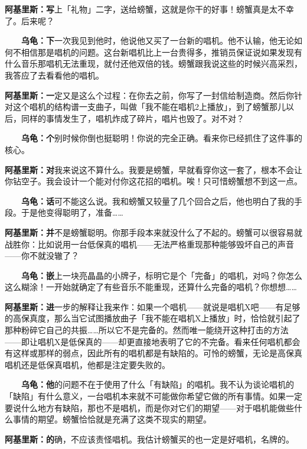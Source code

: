 \documentclass[
  12pt,
  twoside,
  openright,
  oldfontcommands,
]{memoir}
\newcommand{\heititext}[1]{{\heifamily\bfseries #1}}
\newcommand{\dialogname}[1]{{\heifamily\bfseries #1}}
\begin{document}
\dialogname{阿基里斯：}\heititext{写}上「礼物」二字，送给螃蟹，这就是你干的好事！螃蟹真是太不幸了。后来呢？

\dialogname{　　乌龟：}\heititext{下}一次我见到他时，他说他又买了一台新的唱机。他不认输，他无论如何不相信那是唱机的问题。这台新唱机比上一台贵得多，推销员保证说如果发现有什么音乐那唱机无法重现，就付还他双倍的钱。螃蟹跟我说这些的时候兴高采烈，我答应了去看看他的唱机。

\dialogname{阿基里斯：}\heititext{一}定又是这么个过程：在你去之前，你写了一封信给制造商。然后你针对这个唱机的结构谱一支曲子，叫做「我不能在唱机2上播放」，到了螃蟹那儿以后，同样的事情发生了，唱机炸成了碎片，唱片也毁了。对不对？

\dialogname{　　乌龟：}\heititext{个}别时候你倒也挺聪明！你说的完全正确。看来你已经抓住了这件事的核心。

\dialogname{阿基里斯：}\heititext{对}我来说这不算什么。我要是螃蟹，早就看穿你这一套了，根本不会让你钻空子。我会设计一个能对付你这花招的唱机。唉！只可惜螃蟹想不到这一点。

\dialogname{　　乌龟：}\heititext{话}可不能这么说。我和螃蟹又较量了几个回合之后，他也明白了我的手段。于是他变得聪明了，准备\ldots\ldots{}

\dialogname{阿基里斯：}\heititext{并}不是螃蟹聪明。你那手段本来就没什么了不起的。螃蟹可以很容易就战胜你：比如说用一台低保真的唱机------无法严格重现那种能够毁坏自己的声音------你不就没辙了？

\dialogname{　　乌龟：}\heititext{嵌}上一块亮晶晶的小牌子，标明它是个「完备」的唱机，对吗？你怎么这么糊涂！一开始就确定了有些音乐不能重现，还算什么完备的唱机？你想想\ldots\ldots{}

\dialogname{阿基里斯：}\heititext{进}一步的解释让我来作：如果一个唱机------就说是唱机X吧------有足够的高保真度，那么当它试图播放曲子「我不能在唱机X上播放」时，恰恰就引起了那种粉碎它自己的共振\ldots\ldots 所以它不是完备的。然而唯一能绕开这种打击的方法------即让唱机X是低保真的------却更直接地表明了它的不完备。看来任何唱机都会有这样或那样的弱点，因此所有的唱机都是有缺陷的。可怜的螃蟹，无论是高保真唱机还是低保真唱机，他都是注定要失败的。

\dialogname{　　乌龟：}\heititext{他}的问题不在于使用了什么「有缺陷」的唱机。我不认为谈论唱机的「缺陷」有什么意义，一台唱机本来就不可能做你希望它做的所有事情。如果一定要说什么地方有缺陷，那也不是唱机，而是你对它们的期望------对于唱机能做些什么事情的期望。螃蟹恰恰就是充满了这类不现实的期望。

\dialogname{阿基里斯：}\heititext{的}确，不应该责怪唱机。我估计螃蟹买的也一定是好唱机，名牌的。
\end{document}
